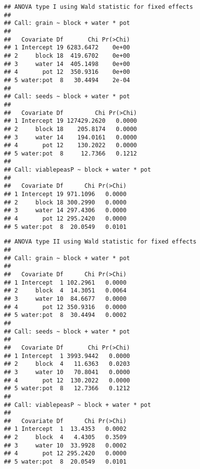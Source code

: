 \begin{knitrout}
\color{fgcolor}\begin{kframe}
\begin{alltt}
\end{alltt}
\begin{verbatim}
## ANOVA type I using Wald statistic for fixed effects
## 
## Call: grain ~ block + water * pot
## 
##   Covariate Df       Chi Pr(>Chi)
## 1 Intercept 19 6283.6472    0e+00
## 2     block 18  419.6702    0e+00
## 3     water 14  405.1498    0e+00
## 4       pot 12  350.9316    0e+00
## 5 water:pot  8   30.4494    2e-04
## 
## Call: seeds ~ block + water * pot
## 
##   Covariate Df         Chi Pr(>Chi)
## 1 Intercept 19 127429.2620   0.0000
## 2     block 18    205.8174   0.0000
## 3     water 14    194.0161   0.0000
## 4       pot 12    130.2022   0.0000
## 5 water:pot  8     12.7366   0.1212
## 
## Call: viablepeasP ~ block + water * pot
## 
##   Covariate Df      Chi Pr(>Chi)
## 1 Intercept 19 971.1096   0.0000
## 2     block 18 300.2990   0.0000
## 3     water 14 297.4306   0.0000
## 4       pot 12 295.2420   0.0000
## 5 water:pot  8  20.0549   0.0101
\end{verbatim}
\end{kframe}
\end{knitrout}


\begin{knitrout}
\color{fgcolor}\begin{kframe}
\begin{alltt}
\end{alltt}
\begin{verbatim}
## ANOVA type II using Wald statistic for fixed effects
## 
## Call: grain ~ block + water * pot
## 
##   Covariate Df      Chi Pr(>Chi)
## 1 Intercept  1 102.2961   0.0000
## 2     block  4  14.3051   0.0064
## 3     water 10  84.6677   0.0000
## 4       pot 12 350.9316   0.0000
## 5 water:pot  8  30.4494   0.0002
## 
## Call: seeds ~ block + water * pot
## 
##   Covariate Df       Chi Pr(>Chi)
## 1 Intercept  1 3993.9442   0.0000
## 2     block  4   11.6363   0.0203
## 3     water 10   70.8041   0.0000
## 4       pot 12  130.2022   0.0000
## 5 water:pot  8   12.7366   0.1212
## 
## Call: viablepeasP ~ block + water * pot
## 
##   Covariate Df      Chi Pr(>Chi)
## 1 Intercept  1  13.4353   0.0002
## 2     block  4   4.4305   0.3509
## 3     water 10  33.9928   0.0002
## 4       pot 12 295.2420   0.0000
## 5 water:pot  8  20.0549   0.0101
\end{verbatim}
\end{kframe}
\end{knitrout}

